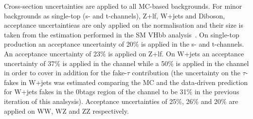 Cross-section uncertainties are applied to all MC-based backgrounds. For minor backgrounds as single-top (s- and t-channels), Z+lf, W+jets and Diboson, acceptance uncertaintieas are only applied on the normalisation and their size is taken from the estimation performed in the SM VHbb analysis~\cite{ATLAS-CONF-2020-006, AlKhoury:2690042}.  On single-top production an acceptance uncertainty of 20\% is applied  in the s- and t-channels. An acceptance uncertainty of 23\% is applied on Z+lf. On W+jets an acceptance uncertainty of 37\% is applied in the \lephad channel while a 50\% is applied in the \hadhad channel in order to cover in addition for the fake-$\tau$ contribution (the uncertainty on the $\tau$-fakes in W+jets was estimated comparing the MC and the data-driven prediction for W+jets fakes in the 0btags region of the \lephad channel to be 31\% in the previous iteration of this analsysis). Acceptance uncertainties of 25\%, 26\% and 20\% are applied on WW, WZ and ZZ respectively.
